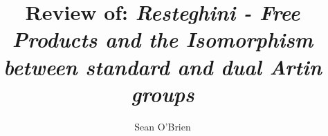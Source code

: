 \documentclass{amsart}
\begin{document}
\title{Review of: \newline
	\emph{Resteghini - Free Products and the Isomorphism between standard and dual Artin groups}}


\author{Sean O'Brien}
\address{}
\curraddr{}




\maketitle








\end{document}

